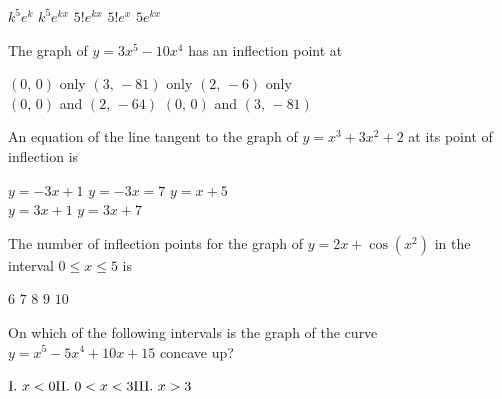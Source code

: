 \begin{questions}
    \begin{oneparchoices}
        \choice $k^5e^k$
        \choice $k^5e^{kx}$
        \choice $5!e^{kx}$
        \choice $5!e^{x}$
        \choice $5e^{kx}$
    \end{oneparchoices} \par \horizontalline

    \question The graph of $y = 3x^5 - 10x^4$ has an inflection point at \\

    \begin{oneparchoices}
        \choice $(0, \, 0)$ only
        \choice $(3, \, -81)$ only
        \choice $(2, \, -6)$ only \\[11pt]
        \makebox[0.18\textwidth] \choice $(0, \, 0)$ and $(2, \, -64)$
        \makebox[0.21\textwidth] \choice $(0, \, 0)$ and $(3, \, -81)$
    \end{oneparchoices} \par \horizontalline

    \question An equation of the line tangent to the graph of $y = x^3 + 3x^2 + 2$ at its point of inflection is \\

    \begin{oneparchoices}
        \choice $y = -3x + 1$
        \choice $y = -3x = 7$
        \choice $y = x + 5$ \\[11pt]
        \makebox[0.25\textwidth] \choice $y = 3x + 1$
        \makebox[0.28\textwidth] \choice $y = 3x + 7$
    \end{oneparchoices} \par \horizontalline

    \question The number of inflection points for the graph of $y = 2x + \cos \left(x^2\right)$ in the interval $0 \leq x \leq 5$ is \\

    \begin{oneparchoices}
        \choice $6$
        \choice $7$
        \choice $8$
        \choice $9$
        \choice $10$
    \end{oneparchoices} \par \horizontalline

    \question On which of the following intervals is the graph of the curve $y = x^5 - 5x^4 + 10x + 15$ concave up? \begin{center}
        $\hfill \text{I. $x < 0$} \hfill \text{II. $0 < x < 3$} \hfill \text{III. $x > 3$} \hfill$
    \end{center} \vspace{11pt}


\end{questions}
